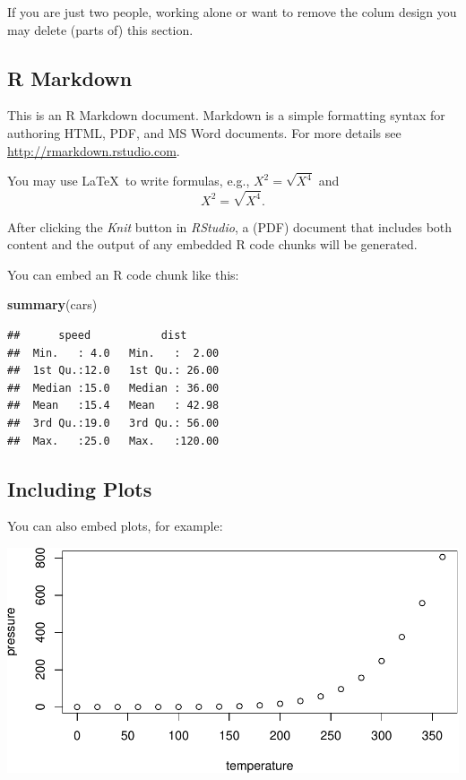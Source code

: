 \documentclass[11pt,a4paper]{article}
\let\origfigure\figure
\let\endorigfigure\endfigure
\renewenvironment{figure}[1][2] {
    \expandafter\origfigure\expandafter[H]
} {
    \endorigfigure
}
\newenvironment{Shaded}{\begin{snugshade}}{\end{snugshade}}
\newcommand{\KeywordTok}[1]{\textcolor[rgb]{0.13,0.29,0.53}{\textbf{#1}}}
\newcommand{\NormalTok}[1]{#1}
\begin{document}
If you are just two people, working alone or want to remove the colum
design you may delete (parts of) this section.

\hypertarget{r-markdown}{%
\subsection{R Markdown}\label{r-markdown}}

This is an R Markdown document. Markdown is a simple formatting syntax
for authoring HTML, PDF, and MS Word documents. For more details see
\url{http://rmarkdown.rstudio.com}.

You may use \LaTeX~to write formulas, e.g., \(X^2 = \sqrt{X^4}\) and
\[X^2 = \sqrt{X^4}.\]

After clicking the \emph{Knit} button in \emph{RStudio}, a (PDF)
document that includes both content and the output of any embedded R
code chunks will be generated.

You can embed an R code chunk like this:

\begin{Shaded}
\begin{Highlighting}[]
\KeywordTok{summary}\NormalTok{(cars)}
\end{Highlighting}
\end{Shaded}

\begin{verbatim}
##      speed           dist       
##  Min.   : 4.0   Min.   :  2.00  
##  1st Qu.:12.0   1st Qu.: 26.00  
##  Median :15.0   Median : 36.00  
##  Mean   :15.4   Mean   : 42.98  
##  3rd Qu.:19.0   3rd Qu.: 56.00  
##  Max.   :25.0   Max.   :120.00
\end{verbatim}

\hypertarget{including-plots}{%
\subsection{Including Plots}\label{including-plots}}

You can also embed plots, for example:

\begin{figure}
\centering
\includegraphics{Seminararbeit_files/figure-latex/pressure-1.pdf}
\caption{\label{fig:pressure} Pressure}
\end{figure}
\end{document}
